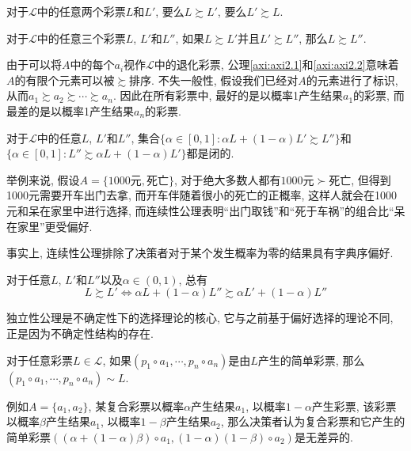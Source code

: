 \documentclass[cn, 12pt, math=mtpro2, bibstyle=apa, blue]{elegantbook}
\begin{document}
\begin{axiom}[完备性]\label{axi:axi2.1}
对于$\mathscr{L}$中的任意两个彩票$L$和$L'$, 要么$L\succsim L'$, 要么$L'\succsim L$.
\end{axiom}

\begin{axiom}[传递性]\label{axi:axi2.2}
对于$\mathscr{L}$中的任意三个彩票$L$, $L'$和$L''$, 如果$L\succsim L'$并且$L'\succsim L''$, 那么$L\succsim L''$.
\end{axiom}

由于可以将$A$中的每个$a_i$视作$\mathscr{L}$中的退化彩票, 公理\ref{axi:axi2.1}和\ref{axi:axi2.2}意味着$A$的有限个元素可以被$
\succsim$排序. 不失一般性, 假设我们已经对$A$的元素进行了标识, 从而$a_1\succsim a_2\succsim\cdots\succsim a_n$. 因此在所有彩票中, 最好的是以概率1产生结果$a_1$的彩票, 而最差的是以概率1产生结果$a_n$的彩票.

\begin{axiom}[连续性]\label{axi:axi2.3}
对于$\mathscr{L}$中的任意$L$, $L'$和$L''$, 集合$\{\alpha\in[0,1]:\alpha L+(1-\alpha)L'\succsim L''\}$和$\{\alpha\in[0,1]:L''\succsim \alpha L+(1-\alpha)L'\}$都是闭的.
\end{axiom}
举例来说, 假设$A=\{1000\text{元},\text{死亡}\}$, 对于绝大多数人都有$1000\text{元}\succ\text{死亡}$, 但得到1000元需要开车出门去拿, 而开车伴随着很小的死亡的正概率, 这样人就会在1000元和呆在家里中进行选择, 而连续性公理表明“出门取钱”和“死于车祸”的组合比“呆在家里”更受偏好. 

事实上, 连续性公理排除了决策者对于某个发生概率为零的结果具有字典序偏好.

\begin{axiom}[独立性]\label{axi:axi2.4}
对于任意$L$, $L'$和$L''$以及$\alpha\in(0,1)$, 总有
$$L\succsim L'\Longleftrightarrow \alpha L+(1-\alpha)L''\succsim \alpha L'+(1-\alpha)L''$$
\end{axiom}
独立性公理是不确定性下的选择理论的核心, 它与之前基于偏好选择的理论不同, 正是因为不确定性结构的存在.

\begin{proposition}[复合彩票的简化]\label{pro:pro2.1}
对于任意彩票$L\in\mathscr{L}$, 如果$(p_1\circ a_1,\cdots,p_n\circ a_n)$是由$L$产生的简单彩票, 那么$(p_1\circ a_1,\cdots,p_n\circ a_n)\sim L$.
\end{proposition}
例如$A=\{a_1,a_2\}$, 某复合彩票以概率$\alpha$产生结果$a_1$, 以概率$1-\alpha$产生彩票, 该彩票以概率$\beta$产生结果$a_1$, 以概率$1-\beta$产生结果$a_2$, 那么决策者认为复合彩票和它产生的简单彩票$((\alpha+(1-\alpha)\beta)\circ a_1, (1-\alpha)(1-\beta)\circ a_2)$是无差异的.
\end{document}
